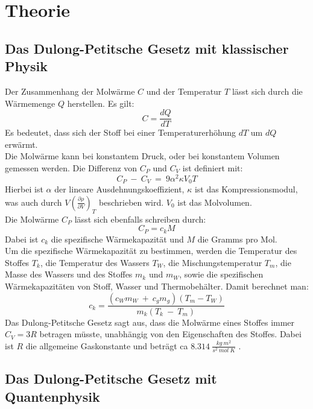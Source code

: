 \section{Theorie}
\label{sec:Theorie}

\subsection{Das Dulong-Petitsche Gesetz mit klassischer Physik}

Der Zusammenhang der Molwärme $C$ und der Temperatur $T$ lässt sich durch die Wärmemenge $Q$ herstellen.
Es gilt:
\begin{equation}
    C = \frac{dQ}{dT}
\end{equation}
Es bedeutet, dass sich der Stoff bei einer Temperaturerhöhung $dT$ um $dQ$ erwärmt.\\
Die Molwärme kann bei konstantem Druck, oder bei konstantem Volumen gemessen werden.
Die Differenz von $C_P$ und $C_V$ ist definiert mit:
\begin{equation}
    C_P\ -\ C_V \ =\ 9\alpha^2 \kappa V_0 T
    \label{eq:cv}
\end{equation}
Hierbei ist $\alpha$ der lineare Ausdehnungskoeffizient, $\kappa$ ist das Kompressionsmodul, was auch durch $V(\frac{\partial\rho}{\partial V})_T$ beschrieben wird.
$V_0$ ist das Molvolumen.\\
Die Molwärme $C_P$ lässt sich ebenfalls schreiben durch:
\begin{equation}
    C_P = c_kM
    \label{eq:cp}
\end{equation}
Dabei ist $c_k$ die spezifische Wärmekapazität und $M$ die Gramms pro Mol.\\
Um die spezifische Wärmekapazität zu bestimmen, werden die Temperatur des Stoffes $T_k$, die Temperatur des Wassers $T_W$, die Mischungstemperatur $T_m$, die Masse des Wassers und des Stoffes $m_k$ und $m_W$, sowie die spezifischen Wärmekapazitäten von Stoff, Wasser und Thermobehälter.
Damit berechnet man:
\begin{equation}
    c_k = \frac{(c_Wm_W\ +\ c_gm_g)(T_m-T_W)}{m_k(T_k\ -\ T_m)}
    \label{eq:warmcap}
\end{equation}
\newline
Das Dulong-Petitsche Gesetz sagt aus, dass die Molwärme eines Stoffes immer $C_V = 3R$ betragen müsste, unabhängig von den Eigenschaften des Stoffes.
Dabei ist $R$ die allgemeine Gaskonstante und beträgt ca $8.314\ \frac{kg\ m^2}{s^2\ mol\ K}$ \cite{gas}.

\subsection{Das Dulong-Petitsche Gesetz mit Quantenphysik}

